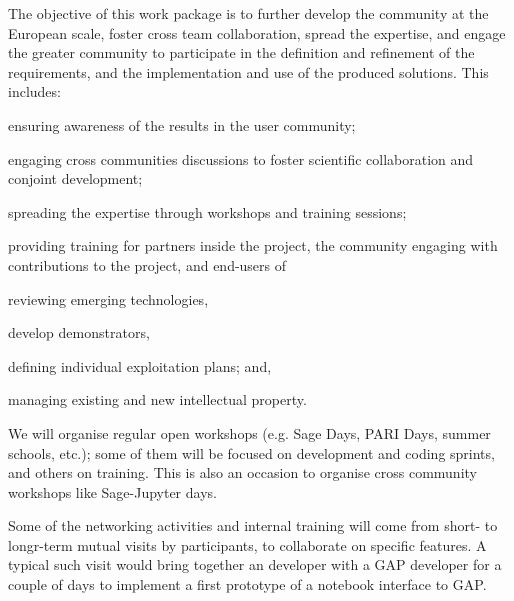 
\begin{workpackage}[id=dissem,wphases=0-48!.5,
  short={Community Building/Dissemination},
  title={Community Building, Training, Dissemination, Exploitation, and Outreach},
  lead=PS,
  PSRM=10,
  SARM=18,
  USORM=16,
  USHRM=17,
  USRM=30,
  UVRM=2,
  UKRM=2,
  UBRM=20,
  SRRM=2,
  LLRM=6
]


\begin{wpobjectives}
  The objective of this work package is to further develop the community at the
  European scale, foster cross team collaboration, spread the
  expertise, and engage the greater community to participate in the
  definition and refinement of the requirements, and the implementation and use of the
  produced solutions. This includes:
  \begin{compactitem}
  \item ensuring awareness of the results in the user community;
  \item engaging cross communities discussions to foster scientific collaboration and conjoint development;
  \item spreading the expertise through workshops and training sessions;
  \item providing training for partners inside the project, the
    community engaging with contributions to the project, and
    end-users of \TheProject
  \item reviewing emerging technologies,
  \item develop demonstrators,
  \item defining individual exploitation plans; and,
  \item managing existing and new intellectual property.
  \end{compactitem}
\end{wpobjectives}

\begin{wpdescription}
  We will organise regular open workshops (e.g. Sage Days, PARI Days,
  summer schools, etc.); some of them will be focused on development
  and coding sprints, and others on training. This is also an occasion
  to organise cross community workshops like Sage-Jupyter days.

  Some of the networking activities and internal training will come
  from short- to longr-term mutual visits by participants, to
  collaborate on specific features. A typical such visit would bring
  together an \Jupyter developer with a GAP developer for a couple of
  days to implement a first prototype of a notebook interface to GAP.


\end{wpdescription}
\end{workpackage}

